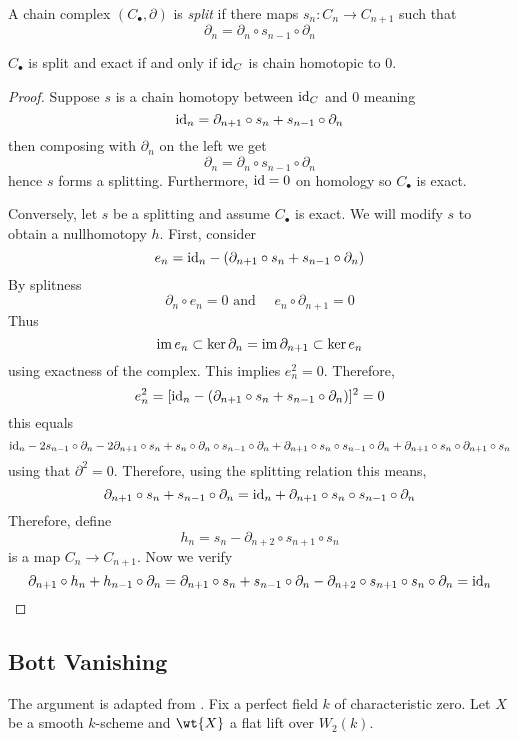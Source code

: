 \documentclass[12pt]{article}
\begin{document}
\begin{defn}
A chain complex $(C_{\bullet}, \partial)$ is \textit{split} if there maps $s_n : C_n \to C_{n+1}$ such that
\[ \partial_n = \partial_n \circ s_{n-1} \circ \partial_n \]
\end{defn}

\begin{lemma}
$C_\bullet$ is split and exact if and only if $\mathrm{id}_C$ is chain homotopic to $0$.
\end{lemma}

\begin{proof}
Suppose $s$ is a chain homotopy between $\mathrm{id}_C$ and $0$ meaning
\[ \mathrm{id}_n = \partial_{n+1} \circ s_n + s_{n-1} \circ \partial_{n} \]
then composing with $\partial_n$ on the left we get
\[ \partial_n = \partial_n \circ s_{n-1} \circ \partial_n \]
hence $s$ forms a splitting. Furthermore, $\mathrm{id} = 0$ on homology so $C_\bullet$ is exact.
\par 
Conversely, let $s$ be a splitting and assume $C_\bullet$ is exact. We will modify $s$ to obtain a nullhomotopy $h$. First, consider
\[ e_n = \mathrm{id}_n - (\partial_{n+1} \circ s_n + s_{n-1} \circ \partial_n) \]
By splitness
\[ \partial_n \circ e_n = 0 \text{ and } \quad e_{n} \circ \partial_{n+1} = 0 \]
Thus
\[ \operatorname{\mathrm{im}}{e_n} \subset \ker{\partial_{n}} = \operatorname{\mathrm{im}}{\partial_{n+1}} \subset \ker{e_{n}} \]
using exactness of the complex. This implies $e_n^2 = 0$. Therefore,
\[ e_n^2 = [\mathrm{id}_n - (\partial_{n+1} \circ s_n + s_{n-1} \circ \partial_n)]^2 = 0 \]
this equals
\[ \mathrm{id}_n - 2 s_{n-1} \circ \partial_n - 2 \partial_{n+1} \circ s_n + s_n \circ \partial_n \circ s_{n-1} \circ \partial_n + \partial_{n+1} \circ s_n \circ s_{n-1} \circ \partial_n + \partial_{n+1} \circ s_n \circ \partial_{n+1} \circ s_n \]
using that $\partial^2 = 0$. 
Therefore, using the splitting relation this means,
\[ \partial_{n+1} \circ s_n + s_{n-1} \circ \partial_n = \mathrm{id}_n + \partial_{n+1} \circ s_n \circ s_{n-1} \circ \partial_n \]
Therefore, define
\[ h_n = s_n - \partial_{n+2} \circ s_{n+1} \circ s_n \]
is a map $C_n \to C_{n+1}$. 
Now we verify
\[ \partial_{n+1} \circ h_n + h_{n-1} \circ \partial_n = \partial_{n+1} \circ s_n + s_{n-1} \circ \partial_n - \partial_{n+2} \circ s_{n+1} \circ s_n \circ \partial_n = \mathrm{id}_n \]
\end{proof}

\subsection{Bott Vanishing}

The argument is adapted from . Fix a perfect field $k$ of characteristic zero.  Let $X$ be a smooth $k$-scheme and $\wt{X}$ a flat lift over $W_2(k)$. 
\end{document}
